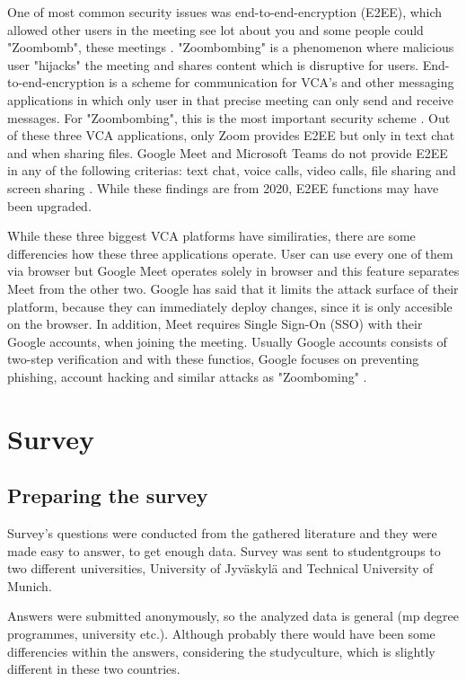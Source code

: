 \documentclass[utf8,english]{gradu3}
\begin{document}
One of most common security issues was end-to-end-encryption (E2EE), which allowed other users in the meeting see lot about you and some people could "Zoombomb", these meetings \parencite{goneWrongZoom}. "Zoombombing" is a phenomenon where malicious user "hijacks" the meeting and shares content which is disruptive for users. End-to-end-encryption is a scheme for communication for VCA's and other messaging applications in which only user in that precise meeting can only send and receive messages. For "Zoombombing", this is the most important security scheme \parencite{e2eeZoom}.
Out of these three VCA applications, only Zoom provides E2EE but only in text chat and when sharing files. Google Meet and Microsoft Teams do not provide E2EE in any of the following criterias: text chat, voice calls, video calls, file sharing and screen sharing \parencite{safetyOfVca}. While these findings are from 2020, E2EE functions may have been upgraded.

While these three biggest VCA platforms have similiraties, there are some differencies how these three applications operate. User can use every one of them via browser but Google Meet operates solely in browser and this feature separates Meet from the other two. Google has said that it limits the attack surface of their platform, because they can immediately deploy changes, since it is only accesible on the browser. In addition, Meet requires Single Sign-On (SSO) with their Google accounts, when joining the meeting. Usually Google accounts consists of two-step verification and with these functios, Google focuses on preventing phishing, account hacking and similar attacks as "Zoomboming" \parencite{dynamicSecurityAnalysis}.

\chapter{Survey}
\label{vca}
\section{Preparing the survey}
Survey's questions were conducted from the gathered literature and they were made easy to answer, to get enough data. Survey was sent to studentgroups to two different universities, University of Jyväskylä and Technical University of Munich. 

Answers were submitted anonymously, so the analyzed data is general (mp degree programmes, university etc.). Although probably there would have been some differencies within the answers, considering the studyculture, which is slightly different in these two countries.
\end{document}
